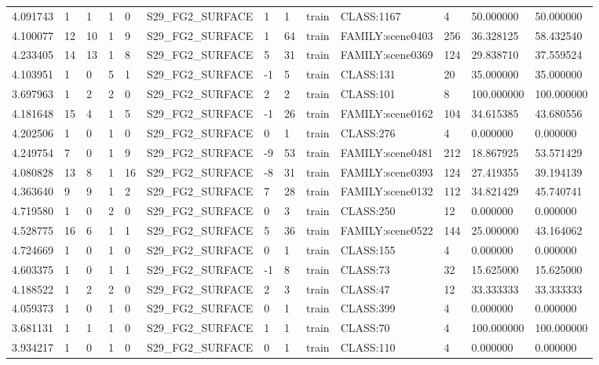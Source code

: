 \begin{tabular}{lllllllllllll}
4.091743 & 1 & 1 & 1 & 0 & S29\_FG2\_SURFACE & 1 & 1 & train & CLASS:1167 & 4 & 50.000000 & 50.000000 \\
4.100077 & 12 & 10 & 1 & 9 & S29\_FG2\_SURFACE & 1 & 64 & train & FAMILY:scene0403 & 256 & 36.328125 & 58.432540 \\
4.233405 & 14 & 13 & 1 & 8 & S29\_FG2\_SURFACE & 5 & 31 & train & FAMILY:scene0369 & 124 & 29.838710 & 37.559524 \\
4.103951 & 1 & 0 & 5 & 1 & S29\_FG2\_SURFACE & -1 & 5 & train & CLASS:131 & 20 & 35.000000 & 35.000000 \\
3.697963 & 1 & 2 & 2 & 0 & S29\_FG2\_SURFACE & 2 & 2 & train & CLASS:101 & 8 & 100.000000 & 100.000000 \\
4.181648 & 15 & 4 & 1 & 5 & S29\_FG2\_SURFACE & -1 & 26 & train & FAMILY:scene0162 & 104 & 34.615385 & 43.680556 \\
4.202506 & 1 & 0 & 1 & 0 & S29\_FG2\_SURFACE & 0 & 1 & train & CLASS:276 & 4 & 0.000000 & 0.000000 \\
4.249754 & 7 & 0 & 1 & 9 & S29\_FG2\_SURFACE & -9 & 53 & train & FAMILY:scene0481 & 212 & 18.867925 & 53.571429 \\
4.080828 & 13 & 8 & 1 & 16 & S29\_FG2\_SURFACE & -8 & 31 & train & FAMILY:scene0393 & 124 & 27.419355 & 39.194139 \\
4.363640 & 9 & 9 & 1 & 2 & S29\_FG2\_SURFACE & 7 & 28 & train & FAMILY:scene0132 & 112 & 34.821429 & 45.740741 \\
4.719580 & 1 & 0 & 2 & 0 & S29\_FG2\_SURFACE & 0 & 3 & train & CLASS:250 & 12 & 0.000000 & 0.000000 \\
4.528775 & 16 & 6 & 1 & 1 & S29\_FG2\_SURFACE & 5 & 36 & train & FAMILY:scene0522 & 144 & 25.000000 & 43.164062 \\
4.724669 & 1 & 0 & 1 & 0 & S29\_FG2\_SURFACE & 0 & 1 & train & CLASS:155 & 4 & 0.000000 & 0.000000 \\
4.603375 & 1 & 0 & 1 & 1 & S29\_FG2\_SURFACE & -1 & 8 & train & CLASS:73 & 32 & 15.625000 & 15.625000 \\
4.188522 & 1 & 2 & 2 & 0 & S29\_FG2\_SURFACE & 2 & 3 & train & CLASS:47 & 12 & 33.333333 & 33.333333 \\
4.059373 & 1 & 0 & 1 & 0 & S29\_FG2\_SURFACE & 0 & 1 & train & CLASS:399 & 4 & 0.000000 & 0.000000 \\
3.681131 & 1 & 1 & 1 & 0 & S29\_FG2\_SURFACE & 1 & 1 & train & CLASS:70 & 4 & 100.000000 & 100.000000 \\
3.934217 & 1 & 0 & 1 & 0 & S29\_FG2\_SURFACE & 0 & 1 & train & CLASS:110 & 4 & 0.000000 & 0.000000 \\

\end{tabular}
